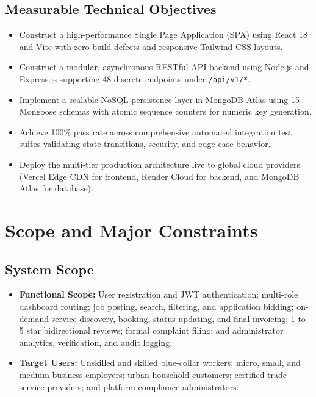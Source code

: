 \subsection{Measurable Technical Objectives}
\begin{itemize}
    \item Construct a high-performance Single Page Application (SPA) using React 18 and Vite with zero build defects and responsive Tailwind CSS layouts.
    \item Construct a modular, asynchronous RESTful API backend using Node.js and Express.js supporting 48 discrete endpoints under \texttt{/api/v1/*}.
    \item Implement a scalable NoSQL persistence layer in MongoDB Atlas using 15 Mongoose schemas with atomic sequence counters for numeric key generation.
    \item Achieve 100\% pass rate across comprehensive automated integration test suites validating state transitions, security, and edge-case behavior.
    \item Deploy the multi-tier production architecture live to global cloud providers (Vercel Edge CDN for frontend, Render Cloud for backend, and MongoDB Atlas for database).
\end{itemize}

\section{Scope and Major Constraints}
\subsection{System Scope}
\begin{itemize}
    \item \textbf{Functional Scope:} User registration and JWT authentication; multi-role dashboard routing; job posting, search, filtering, and application bidding; on-demand service discovery, booking, status updating, and final invoicing; 1-to-5 star bidirectional reviews; formal complaint filing; and administrator analytics, verification, and audit logging.
    \item \textbf{Target Users:} Unskilled and skilled blue-collar workers; micro, small, and medium business employers; urban household customers; certified trade service providers; and platform compliance administrators.
\end{itemize}

